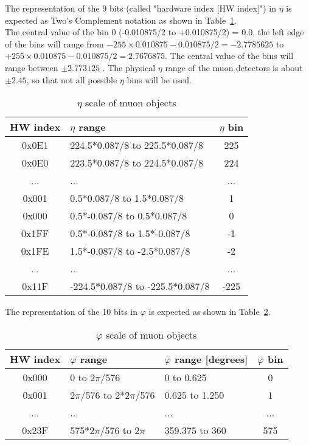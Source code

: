 The representation of the 9 bits (called "hardware index [HW index]") in $\eta$ is expected as Two's Complement notation as shown in Table~\ref{tab:gtl:muon_eta_scale}.\\
The central value of the bin 0 (-0.010875/2 to +0.010875/2) = 0.0, the left edge of the bins will range from $-255 \times 0.010875 - 0.010875/2 = -2.7785625$ to $+255 \times 0.010875 - 0.010875/2 = 2.7676875$.
The central value of the bins will range between $\pm 2.773125$ . The physical $\eta$ range of the muon detectors is about $\pm2.45$, so that not all possible $\eta$ bins will be used.\\

\begin{table}
\caption{$\eta$ scale of muon objects}
\vspace{5mm}
\centering
\begin{tabular}{|c|l|c|}\hline
HW index & $\eta$ range & $\eta$ bin\\\hline\hline
0x0E1 & 224.5$*$0.087/8 to 225.5$*$0.087/8 & 225\\\hline
0x0E0 & 223.5$*$0.087/8 to 224.5$*$0.087/8 & 224\\\hline
... & ... & ...\\\hline
0x001 & 0.5$*$0.087/8 to 1.5$*$0.087/8 & 1\\\hline
0x000 & 0.5$*$-0.087/8 to 0.5$*$0.087/8 & 0\\\hline
0x1FF & 0.5$*$-0.087/8 to 1.5$*$-0.087/8 & -1\\\hline
0x1FE & 1.5$*$-0.087/8 to -2.5$*$0.087/8 & -2\\\hline
... & ... & ...\\\hline
0x11F & -224.5$*$0.087/8 to -225.5$*$0.087/8 & -225\\\hline
\end{tabular}
\label{tab:gtl:muon_eta_scale}
\end{table}

The representation of the 10 bits in $\varphi$ is expected as shown in Table~\ref{tab:gtl:muon_phi_scale}.\\

\begin{table}[ht]
\caption{$\varphi$ scale of muon objects}
\vspace{5mm}
\centering
\begin{tabular}{|c|l|l|c|}\hline
HW index & $\varphi$ range & $\varphi$ range [degrees] & $\varphi$ bin\\\hline\hline
0x000 & 0 to 2$\pi$/576 & 0 to 0.625 & 0\\\hline
0x001 & 2$\pi$/576 to 2$*$2$\pi$/576 & 0.625 to 1.250 & 1\\\hline
... & ... & ... & ...\\\hline
0x23F & 575$*$2$\pi$/576 to 2$\pi$ & 359.375 to 360 & 575\\\hline
\end{tabular}
\label{tab:gtl:muon_phi_scale}
\end{table}

